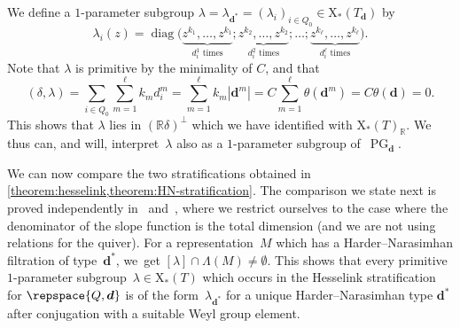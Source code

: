 \documentclass[JEP,XML,SOM,Unicode,NoEqCountersInSection,published]{cedram}
\theoremstyle{plain}
\theoremstyle{definition}
\DeclareMathOperator\PG{PG}
\newcommand\cocharacters{\ensuremath{\mathrm{X}_*}}
\newcommand\tuple[1]{\ensuremath{{\boldsymbol{#1}}}}
\begin{document}
We define a $1$-parameter subgroup $\lambda = \lambda_{\tuple{d}^*} = (\lambda_i)_{i \in Q_0} \in \cocharacters(T_{\tuple{d}})$ by
\begin{equation}
\label{equation:HN-type-1-PS-correspondence}
\lambda_i(z) = \operatorname{diag}\big( \underbrace{z^{k_1},\ldots,z^{k_1}}_{d_i^1 \text{ times}}; \underbrace{z^{k_2},\ldots,z^{k_2}}_{d_i^2 \text{ times}};\ldots; \underbrace{z^{k_\ell},\ldots,z^{k_\ell}}_{d_i^\ell \text{ times}} \big).
\end{equation}
Note that $\lambda$ is primitive by the minimality of $C$,
and that
\begin{equation*}
(\delta,\lambda)
=\sum_{i \in Q_0} \sum_{m=1}^\ell k_md_i^m
=\sum_{m=1}^\ell k_m|\tuple{d}^m|
=C\sum_{m=1}^\ell \theta(\tuple{d}^m)
=C\theta(\tuple{d})
= 0.
\end{equation*}
This shows that $\lambda$ lies in $(\mathbb{R}\delta)^\bot$
which we have identified with $\cocharacters(T)_\mathbb{R}$.
We thus can, and will, interpret~$\lambda$ also as a $1$-parameter subgroup of~$\PG_{\tuple{d}}$.

We can now compare the two stratifications obtained in \cref{theorem:hesselink,theorem:HN-stratification}.
The comparison we state next is proved independently in~\cite[Th.\,3.8]{MR3871820} and~\cite[Th.\,6.3]{MR3199484},
where we restrict ourselves to the case where the denominator of the slope function
is the total dimension (and we are not using relations for the quiver).
For a representation~$M$ which has a Harder--Narasimhan filtration of type~$\tuple{d}^*$, we~get $[\lambda] \cap \Lambda(M) \neq \emptyset$.
This shows that every primitive $1$-parameter subgroup~$\lambda \in \cocharacters(T)$
which occurs in the Hesselink stratification for $\repspace{Q,\tuple{d}}$
is of the form~$\lambda_{\tuple{d}^*}$
for a unique Harder--Narasimhan type $\tuple{d}^*$
after conjugation with a suitable Weyl group element.
\end{document}
